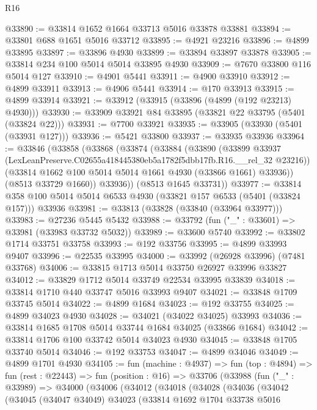 \begin{lexlean}{R16}
\begin{coremodule}
@33890 := @33814 @1652 @1664 @33713 @5016 @33878 @33881
@33894 := @33801 @688 @1651 @5016 @33712
@33895 := @4921 @23216
@33896 := @4899 @33895
@33897 := @33896 @4930
@33899 := @33894 @33897 @33878
@33905 := @33814 @234 @100 @5014 @5014 @33895 @4930
@33909 := @7670 @33800 @116 @5014 @127
@33910 := @4901 @5441
@33911 := @4900 @33910
@33912 := @4899 @33911
@33913 := @4906 @5441
@33914 := @170 @33913
@33915 := @4899 @33914
@33921 := @33912 (@33915 (@33896 (@4899 (@192 @23213) @4930)))
@33930 := @33909 @33921 @84 @33895 (@33821 @22 @33795 (@5401 (@33824 @22)))
@33931 := @7700 @33921
@33935 := @33905 (@33930 (@5401 (@33931 @127)))
@33936 := @5421 @33800
@33937 := @33935 @33936
@33964 := @33846
    (@33858
      (@33868
        (@33874
          (@33884
            (@33890
              (@33899
                @33937
                (LexLeanPreserve.C02655a418445380eb5a1782f5dbb17fb.R16.__rel_32 @23216))
              (@33814 @1662 @100 @5014 @5014 @1661 @4930 (@33866 @1661) @33936))
            (@8513 @33729 @1660))
          @33936))
      (@8513 @1645 @33731))
@33977 := @33814 @358 @100 @5014 @5014 @6533 @4930 (@33821 @157 @6533 (@5401 (@33824 @157))) @33936
@33981 := @33813 (@33828 (@33840 (@33964 @33977)))
@33983 := @27236 @5445 @5432
@33988 := @33792 (fun ("_" : @33601) => @33981 (@33983 @33732 @5032))
@33989 := @33600 @5740
@33992 := @33802 @1714 @33751 @33758
@33993 := @192 @33756
@33995 := @4899 @33993 @9407
@33996 := @22535 @33995
@34000 := @33992 (@26928 @33996) (@7481 @33768)
@34006 := @33815 @1713 @5014 @33750 @26927 @33996 @33827
@34012 := @33829 @1712 @5014 @33749 @22534 @33995 @33839
@34018 := @33814 @1710 @440 @33747 @5016 @33993 @9407
@34021 := @33848 @1709 @33745 @5014
@34022 := @4899 @1684
@34023 := @192 @33755
@34025 := @4899 @34023 @4930
@34028 := @34021 (@34022 @34025) @33993
@34036 := @33814 @1685 @1708 @5014 @33744 @1684 @34025 (@33866 @1684)
@34042 := @33814 @1706 @100 @33742 @5014 @34023 @4930
@34045 := @33848 @1705 @33740 @5014
@34046 := @192 @33753
@34047 := @4899 @34046
@34049 := @4899 @1701 @4930
@34105 := fun (machine : @4937) =>
  fun (top : @4894) =>
  fun (rest : @22443) =>
  fun (position : @16) =>
  @33706
    (@33988
      (fun ("_" : @33989) =>
      @34000
        (@34006
          (@34012
            (@34018
              (@34028
                (@34036
                  (@34042
                    (@34045
                      (@34047 @34049)
                      @34023
                      (@33814
                        @1692
                        @1704
                        @33738
                        @5016

\end{coremodule}
\end{lexlean}
